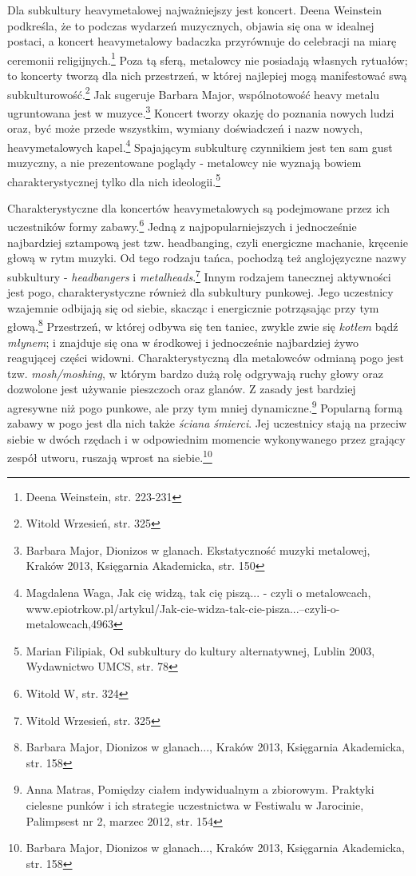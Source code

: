 \documentclass[12pt, a4paper, titlepage]{report}
\begin{document}
Dla subkultury heavymetalowej najważniejszy jest koncert. Deena Weinstein podkreśla, że to podczas wydarzeń muzycznych, objawia się ona w idealnej postaci, a koncert heavymetalowy badaczka przyrównuje do celebracji na miarę ceremonii religijnych.\footnote{Deena Weinstein, str. 223-231} Poza tą sferą, metalowcy nie posiadają własnych rytuałów; to koncerty tworzą dla nich przestrzeń, w której najlepiej mogą manifestować swą subkulturowość.\footnote{Witold Wrzesień, str. 325} Jak sugeruje Barbara Major, wspólnotowość heavy metalu ugruntowana jest w muzyce.\footnote{Barbara Major, Dionizos w glanach. Ekstatyczność muzyki metalowej, Kraków 2013, Księgarnia Akademicka, str. 150} Koncert tworzy okazję do poznania nowych ludzi oraz, być może przede wszystkim, wymiany doświadczeń i nazw nowych, heavymetalowych kapel.\footnote{Magdalena Waga, Jak cię widzą, tak cię piszą... - czyli o metalowcach, www.epiotrkow.pl\break /artykul/Jak-cie-widza-tak-cie-pisza...--czyli-o-metalowcach,4963} Spajającym subkulturę czynnikiem jest ten sam gust muzyczny, a nie prezentowane poglądy - metalowcy nie wyznają bowiem charakterystycznej tylko dla nich ideologii.\footnote{Marian Filipiak, Od subkultury do kultury alternatywnej, Lublin 2003, Wydawnictwo UMCS, str. 78}

Charakterystyczne dla koncertów heavymetalowych są podejmowane przez ich uczestników formy zabawy.\footnote{Witold W, str. 324} Jedną z najpopularniejszych i jednocześnie najbardziej sztampową jest tzw. headbanging, czyli energiczne machanie, kręcenie głową w rytm muzyki. Od tego rodzaju tańca, pochodzą też anglojęzyczne nazwy subkultury - \textit{headbangers} i \textit{metalheads}.\footnote{Witold Wrzesień, str. 325} Innym rodzajem tanecznej aktywności jest pogo, charakterystyczne również dla subkultury punkowej. Jego uczestnicy wzajemnie odbijają się od siebie, skacząc i energicznie potrząsając przy tym głową.\footnote{Barbara Major, Dionizos w glanach..., Kraków 2013, Księgarnia Akademicka, str. 158} Przestrzeń, w której odbywa się ten taniec, zwykle zwie się \textit{kotłem} bądź \textit{młynem}; i znajduje się ona w środkowej i jednocześnie najbardziej żywo reagującej części widowni. Charakterystyczną dla metalowców odmianą pogo jest tzw. \textit{mosh/moshing}, w którym bardzo dużą rolę odgrywają ruchy głowy oraz dozwolone jest używanie pieszczoch oraz glanów. Z zasady jest bardziej agresywne niż pogo punkowe, ale przy tym mniej dynamiczne.\footnote{Anna Matras, Pomiędzy ciałem indywidualnym a zbiorowym. Praktyki cielesne punków i ich strategie uczestnictwa w Festiwalu w Jarocinie, Palimpsest nr 2, marzec 2012, str. 154} Popularną formą zabawy w pogo jest dla nich także \textit{ściana śmierci}. Jej uczestnicy stają na przeciw siebie w dwóch rzędach i w odpowiednim momencie wykonywanego przez grający zespół utworu, ruszają wprost na siebie.\footnote{Barbara Major, Dionizos w glanach..., Kraków 2013, Księgarnia Akademicka, str. 158} 
\end{document}
